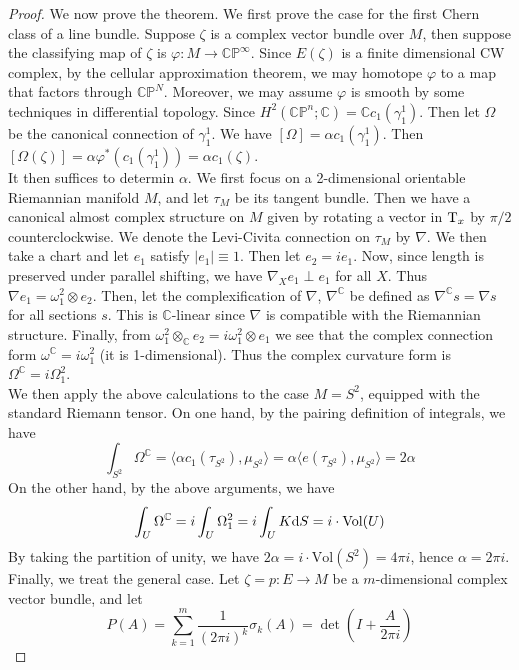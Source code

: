 	\begin{proof}
		We now prove the theorem. We first prove the case for the first Chern class of a line bundle. Suppose $\zeta$ is a complex vector bundle over $M$, then suppose the classifying map of $\zeta$ is $\varphi:M\to\mathbb{CP}^\infty$. Since $E(\zeta)$ is a finite dimensional CW complex, by the cellular approximation theorem, we may homotope $\varphi$ to a map that factors through $\mathbb{CP}^N$. Moreover, we may assume $\varphi$ is smooth by some techniques in differential topology. Since $H^2(\mathbb{CP}^n;\mathbb{C})=\mathbb{C}c_1(\gamma_1^1)$. Then let $\Omega$ be the canonical connection of $\gamma_1^1$. We have $[\Omega]=\alpha c_1(\gamma_1^1)$. Then $[\Omega(\zeta)]=\alpha\varphi^*(c_1(\gamma_1^1))=\alpha c_1(\zeta)$. \\
		It then suffices to determin $\alpha$. We first focus on a 2-dimensional orientable Riemannian manifold $M$, and let $\tau_M$ be its tangent bundle. Then we have a canonical almost complex structure on $M$ given by rotating a vector in $\operatorname{\mathrm{T}}_x$ by $\pi/2$ counterclockwise. We denote the Levi-Civita connection on $\tau_M$ by $\nabla$. We then take a chart and let $e_1$ satisfy $|e_1|\equiv1$. Then let $e_2=ie_1$. Now, since length is preserved under parallel shifting, we have $\nabla_Xe_1\perp e_1$ for all $X$. Thus $\nabla e_1=\omega_1^2\otimes e_2$. Then, let the complexification of $\nabla$, $\nabla^\mathbb{C}$ be defined as $\nabla^\mathbb{C}s=\nabla s$ for all sections $s$. This is $\mathbb{C}$-linear since $\nabla$ is compatible with the Riemannian structure. Finally, from $\omega_1^2\otimes_\mathbb{C}e_2=i\omega_1^2\otimes e_1$ we see that the complex connection form $\omega^\mathbb{C}=i\omega_1^2$ (it is 1-dimensional). Thus the complex curvature form is $\Omega^\mathbb{C}=i\Omega_1^2$. \\
		We then apply the above calculations to the case $M=S^2$, equipped with the standard Riemann tensor. On one hand, by the pairing definition of integrals, we have
		\[ \int_{S^2}\Omega^\mathbb{C}=\langle\alpha c_1(\tau_{S^2}),\mu_{S^2}\rangle=\alpha\langle e(\tau_{S^2}),\mu_{S^2}\rangle=2\alpha \]
		On the other hand, by the above arguments, we have 
		\[ \int_U\Omega^\mathbb{C}=i\int_U\Omega_1^2=i\int_UK\mathrm{d} S=i\cdot\mathrm{Vol}(U) \]
		By taking the partition of unity, we have $2\alpha=i\cdot\mathrm{Vol}(S^2)=4\pi i$, hence $\alpha=2\pi i$. \\
		Finally, we treat the general case. Let $\zeta=p:E\to M$ be a $m$-dimensional complex vector bundle, and let 
		\[ P(A)=\sum_{k=1}^m\frac{1}{(2\pi i)^k}\sigma_k(A)=\det(I+\frac{A}{2\pi i}) \]

\end{proof}
